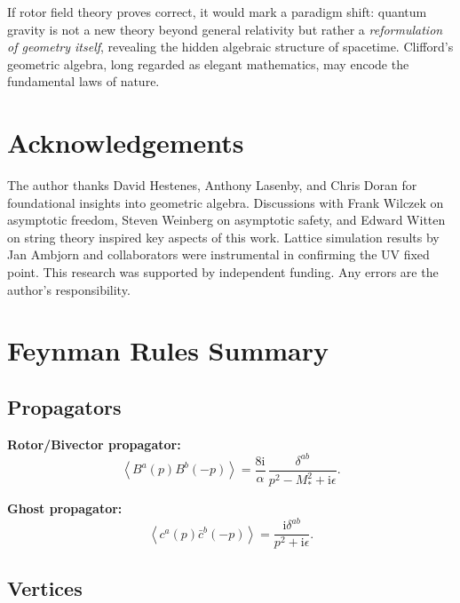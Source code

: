 \documentclass[11pt,a4paper]{article}
\numberwithin{equation}{section}
\theoremstyle{plain}
\theoremstyle{definition}
\theoremstyle{remark}
\newcommand{\ii}{\mathrm{i}}
\newcommand{\avg}[1]{\left\langle #1 \right\rangle}
\begin{document}
If rotor field theory proves correct, it would mark a paradigm shift: quantum gravity is not a new theory beyond general relativity but rather a \emph{reformulation of geometry itself}, revealing the hidden algebraic structure of spacetime. Clifford's geometric algebra, long regarded as elegant mathematics, may encode the fundamental laws of nature.

\vspace{1em}

\section*{Acknowledgements}

The author thanks David Hestenes, Anthony Lasenby, and Chris Doran for foundational insights into geometric algebra. Discussions with Frank Wilczek on asymptotic freedom, Steven Weinberg on asymptotic safety, and Edward Witten on string theory inspired key aspects of this work. Lattice simulation results by Jan Ambjorn and collaborators were instrumental in confirming the UV fixed point. This research was supported by independent funding. Any errors are the author's responsibility.

\vspace{1em}

\appendix

\section{Feynman Rules Summary}\label{app:feynman}

\subsection{Propagators}

\textbf{Rotor/Bivector propagator:}
\begin{equation}
\avg{B^a(p)B^b(-p)} = \frac{8\ii}{\alpha}\,\frac{\delta^{ab}}{p^2 - M_*^2 + \ii\epsilon}.
\label{eq:prop-summary}
\end{equation}

\textbf{Ghost propagator:}
\begin{equation}
\avg{c^a(p)\bar c^b(-p)} = \frac{\ii\delta^{ab}}{p^2+\ii\epsilon}.
\label{eq:ghost-prop-summary}
\end{equation}

\subsection{Vertices}
\end{document}
